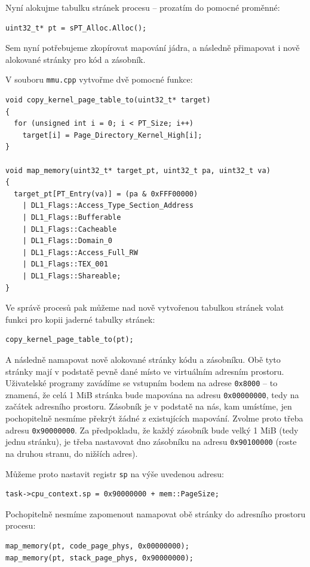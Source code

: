 \documentclass{article}
\begin{document}
Nyní alokujme tabulku stránek procesu -- prozatím do pomocné proměnné:
\begin{lstlisting}
uint32_t* pt = sPT_Alloc.Alloc();
\end{lstlisting}

Sem nyní potřebujeme zkopírovat mapování jádra, a následně přimapovat i nově alokované stránky pro kód a zásobník.

V souboru {\tt mmu.cpp} vytvořme dvě pomocné funkce:
\begin{lstlisting}
void copy_kernel_page_table_to(uint32_t* target)
{
  for (unsigned int i = 0; i < PT_Size; i++)
    target[i] = Page_Directory_Kernel_High[i];
}

void map_memory(uint32_t* target_pt, uint32_t pa, uint32_t va)
{
  target_pt[PT_Entry(va)] = (pa & 0xFFF00000)
    | DL1_Flags::Access_Type_Section_Address
    | DL1_Flags::Bufferable
    | DL1_Flags::Cacheable
    | DL1_Flags::Domain_0
    | DL1_Flags::Access_Full_RW
    | DL1_Flags::TEX_001
    | DL1_Flags::Shareable;
}
\end{lstlisting}

Ve správě procesů pak můžeme nad nově vytvořenou tabulkou stránek volat funkci pro kopii jaderné tabulky stránek:
\begin{lstlisting}
copy_kernel_page_table_to(pt);
\end{lstlisting}

A následně namapovat nově alokované stránky kódu a zásobníku. Obě tyto stránky mají v podstatě pevně dané místo ve virtuálním adresním prostoru. Uživatelské programy zavádíme se vstupním bodem na adrese {\tt 0x8000} -- to znamená, že celá 1 MiB stránka bude mapována na adresu {\tt 0x00000000}, tedy na začátek adresního prostoru. Zásobník je v podstatě na nás, kam umístíme, jen pochopitelně nesmíme překrýt žádné z existujících mapování. Zvolme proto třeba adresu {\tt 0x90000000}. Za předpokladu, že každý zásobník bude velký 1 MiB (tedy jednu stránku), je třeba nastavovat dno zásobníku na adresu {\tt 0x90100000} (roste na druhou stranu, do nižších adres).

Můžeme proto nastavit registr {\tt sp} na výše uvedenou adresu:
\begin{lstlisting}
task->cpu_context.sp = 0x90000000 + mem::PageSize;
\end{lstlisting}

Pochopitelně nesmíme zapomenout namapovat obě stránky do adresního prostoru procesu:
\begin{lstlisting}
map_memory(pt, code_page_phys, 0x00000000);
map_memory(pt, stack_page_phys, 0x90000000);
\end{lstlisting}
\end{document}

